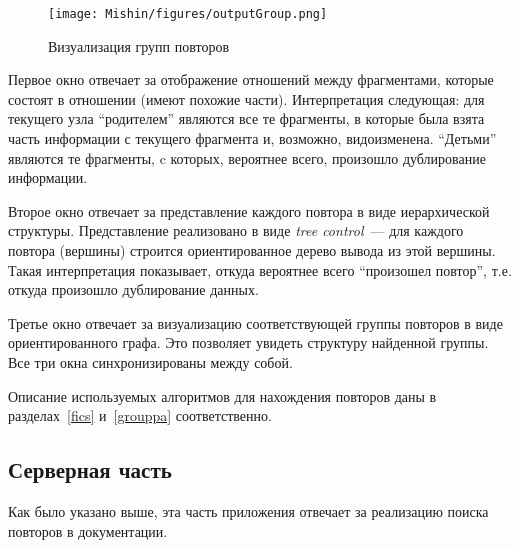 \begin{figure}[h!]
    \centering
    \texttt{[image: Mishin/figures/outputGroup.png]}
    \caption{Визуализация групп повторов}\label{fig:groupViz}
\end{figure}


Первое окно отвечает за  отображение отношений между фрагментами, которые состоят в отношении (имеют похожие части).
Интерпретация следующая: для текущего узла ``родителем'' являются все те фрагменты, в которые была взята часть информации с текущего фрагмента и, возможно, видоизменена.
``Детьми'' являются те фрагменты, c которых, вероятнее всего, произошло дублирование информации.

Второе окно отвечает за представление каждого повтора в виде иерархической структуры.
Представление реализовано в виде \emph{tree control}~--- для каждого повтора (вершины) строится ориентированное дерево вывода из этой вершины.
Такая интерпретация показывает, откуда вероятнее всего ``произошел повтор'', т.е. откуда произошло дублирование данных.

Третье окно отвечает за визуализацию соответствующей группы повторов в виде ориентированного графа.
Это позволяет увидеть структуру найденной группы.
Все три окна синхронизированы между собой.

Описание используемых алгоритмов для нахождения повторов даны в разделах~\ref{fics} и~\ref{grouppa} соответственно.


\subsection{Серверная часть}\label{server}
Как было указано выше, эта часть приложения отвечает за реализацию поиска повторов в документации.

